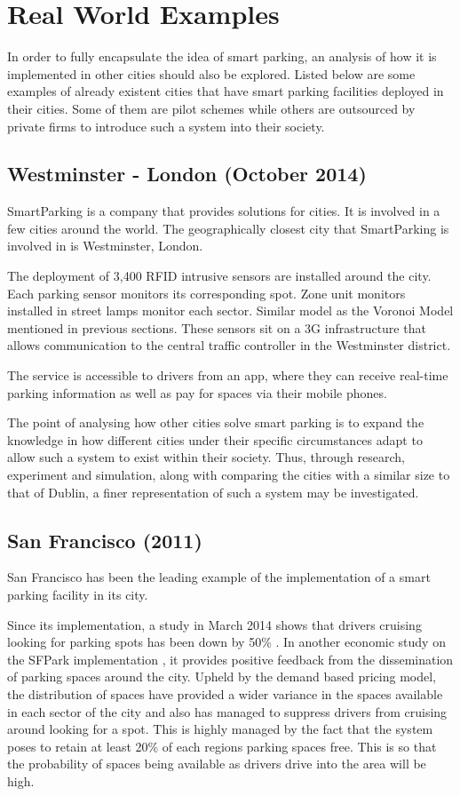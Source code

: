 \section{Real World Examples}
In order to fully encapsulate the idea of smart parking, an analysis of how it is implemented in other cities should also be explored. Listed below are some examples of already existent cities that have smart parking facilities deployed in their cities. Some of them are pilot schemes while others are outsourced by private firms to introduce such a system into their society.

\subsection*{Westminster - London (October 2014)}
SmartParking \citep{18} is a company that provides solutions for cities. It is involved in a few cities around the world. The geographically closest city that SmartParking is involved in is Westminster, London.

The deployment of 3,400 RFID intrusive sensors are installed around the city. Each parking sensor monitors its corresponding spot. Zone unit monitors installed in street lamps monitor each sector. Similar model as the Voronoi Model mentioned in previous sections. These sensors sit on a 3G infrastructure that allows communication to the central traffic controller in the Westminster district. 

The service is accessible to drivers from an app, where they can receive real-time parking information as well as pay for spaces via their mobile phones.

The point of analysing how other cities solve smart parking is to expand the knowledge in how different cities under their specific circumstances adapt to allow such a system to exist within their society. Thus, through research, experiment and simulation, along with comparing the cities with a similar size to that of Dublin, a finer representation of such a system may be investigated.

\subsection*{San Francisco (2011)}
San Francisco has been the leading example of the implementation of a smart parking facility in its city.

Since its implementation, a study in March 2014 shows that drivers cruising looking for parking spots has been down by 50\% \citep{Millard-Ball2014IsExperiment}. In another economic study on the SFPark implementation \citep{Shriver2016UnderstandingProject}, it provides positive feedback from the dissemination of parking spaces around the city. Upheld by the demand based pricing model, the distribution of spaces have provided a wider variance in the spaces available in each sector of the city and also has managed to suppress drivers from cruising around looking for a spot. This is highly managed by the fact that the system poses to retain at least 20\% of each regions parking spaces free. This is so that the probability of spaces being available as drivers drive into the area will be high.